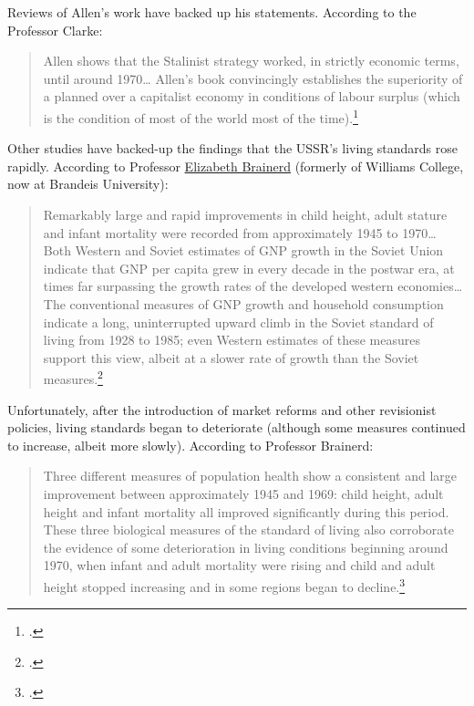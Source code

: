 Reviews of Allen's work have backed up his statements. According to the
Professor Clarke:

\begin{quote}
Allen shows that the Stalinist strategy worked, in strictly economic
terms, until around 1970\ldots{} Allen's book convincingly establishes
the superiority of a planned over a capitalist economy in conditions of
labour surplus (which is the condition of most of the world most of the
  time).\footcite{clarke2005farm}
\end{quote}

Other studies have backed-up the findings that the USSR's living
standards rose rapidly. According to Professor
\href{https://www.ebrainerd.com/}{Elizabeth Brainerd} (formerly of
Williams College, now at Brandeis University):

\begin{quote}
Remarkably large and rapid improvements in child height, adult stature
and infant mortality were recorded from approximately 1945 to
1970\ldots{} Both Western and Soviet estimates of GNP growth in the
Soviet Union indicate that GNP per capita grew in every decade in the
postwar era, at times far surpassing the growth rates of the developed
western economies\ldots{} The conventional measures of GNP growth and
household consumption indicate a long, uninterrupted upward climb in the
Soviet standard of living from 1928 to 1985; even Western estimates of
these measures support this view, albeit at a slower rate of growth than
  the Soviet measures.\footcite{brainerd2010reassessing}
\end{quote}

Unfortunately, after the introduction of market reforms and other
revisionist policies, living standards began to deteriorate (although
some measures continued to increase, albeit more slowly). According to
Professor Brainerd:

\begin{quote}
Three different measures of population health show a consistent and
large improvement between approximately 1945 and 1969: child height,
adult height and infant mortality all improved significantly during this
period. These three biological measures of the standard of living also
corroborate the evidence of some deterioration in living conditions
beginning around 1970, when infant and adult mortality were rising and
child and adult height stopped increasing and in some regions began to
  decline.\footcite{brainerd2010reassessing}
\end{quote}

